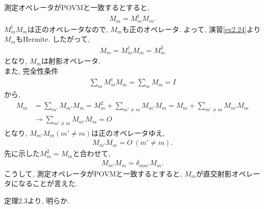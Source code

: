 \begin{ex}
    \label{ex2.62}
    測定オペレータがPOVMと一致するとすると,
    \begin{align*}
        M_m = M_m^\dagger M_m .
    \end{align*}
    $M_m^\dagger M_m$は正のオペレータなので, $M_m$も正のオペレータ.
    よって, 演習\ref{ex2.24}より$M_m$もHermite. したがって,
    \begin{align*}
        M_m = M_m^\dagger M_m = M_m^2
    \end{align*}
    となり, $M_m$は射影オペレータ.
    \\
    また, 完全性条件
    \begin{align*}
        \sum_m M^\dagger_m M_m =  \sum_m M_m = I
    \end{align*}
    から,
    \begin{align*}
        M_m
         & = \sum_{m'} M_{m'} M_m
        = M_m^2 + \sum_{m'\neq m} M_{m'} M_m
        = M_m + \sum_{m'\neq m} M_{m'} M_m
        \\
         & \to  \sum_{m'\neq m} M_{m'} M_m = O
    \end{align*}
    となり, $M_{m'} M_m (m'\neq m)$は正のオペレータゆえ,
    \begin{align*}
        M_{m'} M_m  = O \ (m'\neq m).
    \end{align*}
    先に示した$M_m^2 = M_m$と合わせて,
    \begin{align*}
        M_{m'} M_m  = \delta_{m m'} M_m.
    \end{align*}
    こうして, 測定オペレータがPOVMと一致するとすると, $M_m$が直交射影オペレータになることが言えた.
\end{ex}

\begin{ex}
    \label{ex2.63}
    定理2.3より, 明らか.
\end{ex}

